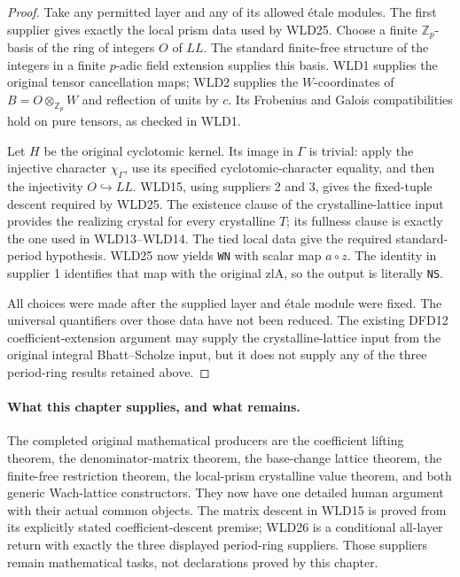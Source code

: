 \begin{proof}
Take any permitted layer and any of its allowed \'etale modules.
The first supplier gives exactly the local prism data used by
WLD25. Choose a finite $\mathbb Z_p$-basis of the ring of integers
$O$ of $LL$. The standard finite-free structure of the integers
in a finite $p$-adic field extension supplies this basis.
WLD1 supplies the original tensor cancellation maps; WLD2 supplies
the $W$-coordinates of $B=O\otimes_{\mathbb Z_p}W$ and reflection
of units by $c$. Its Frobenius and Galois compatibilities hold on
pure tensors, as checked in WLD1.

Let $H$ be the original cyclotomic kernel. Its image in $\Gamma$
is trivial: apply the injective character $\chi_\Gamma$, use
its specified cyclotomic-character equality, and then the
injectivity $O\hookrightarrow LL$.
WLD15, using suppliers 2 and 3, gives the fixed-tuple descent
required by WLD25. The existence clause of the crystalline-lattice
input provides the realizing crystal for every crystalline $T$;
its fullness clause is exactly the one used in WLD13--WLD14.
The tied local data give the required standard-period hypothesis.
WLD25 now yields \texttt{WN} with scalar map $a\circ z$.
The identity in supplier 1 identifies that map with the original
$\mathrm{zlA}$, so the output is literally \texttt{NS}.

All choices were made after the supplied layer and \'etale module
were fixed. The universal quantifiers over those data have not
been reduced. The existing DFD12 coefficient-extension argument
may supply the crystalline-lattice input from the original
integral Bhatt--Scholze input, but it does not supply any of the
three period-ring results retained above.
\end{proof}

\paragraph{What this chapter supplies, and what remains.}
The completed original mathematical producers are the coefficient
lifting theorem, the denominator-matrix theorem, the base-change
lattice theorem, the finite-free restriction theorem, the local-prism
crystalline value theorem, and both generic Wach-lattice constructors.
They now have one detailed human argument with their actual common
objects. The matrix descent in WLD15 is proved from its explicitly
stated coefficient-descent premise; WLD26 is a conditional all-layer
return with exactly the three displayed period-ring suppliers.
Those suppliers remain mathematical tasks, not declarations proved
by this chapter.

